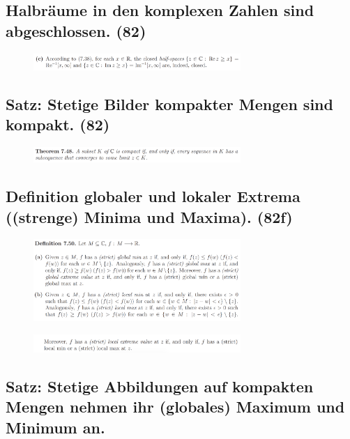 \subsection{Halbräume in den komplexen Zahlen sind abgeschlossen. (82)}

\begin{figure}[H] \centering
\includegraphics[width=0.7\textwidth]{media/7-15.png}
\end{figure}

\subsection{Satz: Stetige Bilder kompakter Mengen sind kompakt. (82)}

\begin{figure}[H] \centering
\includegraphics[width=0.7\textwidth]{media/7-16.png}
\end{figure}

\subsection{Definition globaler und lokaler Extrema ((strenge) Minima und Maxima). (82f)}

\begin{figure}[H] \centering
\includegraphics[width=0.7\textwidth]{media/7-17.png}
\end{figure}
\begin{figure}[H] \centering
\includegraphics[width=0.7\textwidth]{media/7-17-2.png}
\end{figure}

\subsection{Satz: Stetige Abbildungen auf kompakten Mengen nehmen ihr (globales) Maximum und Minimum an.}

